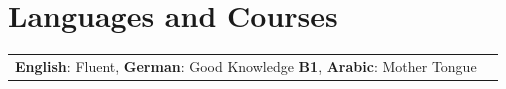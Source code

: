 \documentclass[a4paper,13pt]{article}
\begin{document}

\section{Languages and Courses}
\begin{adjustwidth}{-2cm}{}
	\begin{tabular}{rp{17.5cm}}
\textbf{English}: Fluent, 
\textbf{German}: Good Knowledge \textbf{B1}, 
\textbf{Arabic}: Mother Tongue\\
\end{tabular}
\end{adjustwidth}







\end{document}
